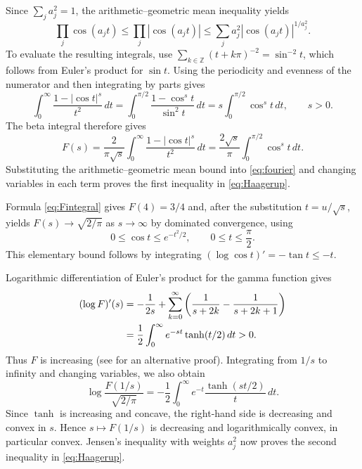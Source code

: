 \documentclass[a4paper,twoside,11pt,reqno]{amsart}
\theoremstyle{definition}
\theoremstyle{remark}
\newcommand{\1}{\mathbbm{1}}
\newcommand{\Z}{\mathbb{Z}}
\def \Z {\mathbb{Z}}
\begin{document}
Since $\sum_j a_j^2=1$, the arithmetic--geometric mean inequality yields
\[
 \prod_j\cos(a_jt)\le\prod_j|\cos(a_jt)|
 \le\sum_j a_j^2|\cos(a_jt)|^{1/a_j^2}.
\]
To evaluate the resulting integrals, use
$\sum_{k\in\Z}(t+k\pi)^{-2}=\sin^{-2}t$, which follows from Euler's product for $\sin t$. Using the periodicity and evenness of the numerator and then integrating by parts gives
\begin{equation}\label{eq:cosineintegral}
 \int_0^\infty\frac{1-|\cos t|^s}{t^2}\,dt
 =\int_0^{\pi/2}\frac{1-\cos^s t}{\sin^2t}\,dt
 =s\int_0^{\pi/2}\cos^s t\,dt,\qquad s>0.
\end{equation}
The beta integral therefore gives
\begin{equation}\label{eq:Fintegral}
 F(s)=\frac2{\pi\sqrt s}\int_0^\infty\frac{1-|\cos t|^s}{t^2}\,dt
     =\frac{2\sqrt s}{\pi}\int_0^{\pi/2}\cos^s t\,dt.
\end{equation}
Substituting the arithmetic--geometric mean bound into \eqref{eq:fourier} and changing variables in each term proves the first inequality in \eqref{eq:Haagerup}.

Formula \eqref{eq:Fintegral} gives $F(4)=3/4$ and, after the substitution $t=u/\sqrt s$, yields $F(s)\to\sqrt{2/\pi}$ as $s\to\infty$ by dominated convergence, using
\begin{equation}\label{eq:cosgaussian}
 0\le\cos t\le e^{-t^2/2},\qquad 0\le t\le\frac\pi2.
\end{equation}
This elementary bound follows by integrating $(\log\cos t)'=-\tan t\le-t$.

Logarithmic differentiation of Euler's product for the gamma function gives
\begin{align}
 (\log F)'(s)
 &=-\frac1{2s}+\sum_{k=0}^\infty
       \left(\frac1{s+2k}-\frac1{s+2k+1}\right)\notag\\
 &=\frac12\int_0^\infty e^{-st}\tanh(t/2)\,dt>0.
 \label{eq:logderivative}
\end{align}
Thus $F$ is increasing (see \cite[Section~4.2, proof of Theorem~32]{NT23} for an alternative proof). Integrating from $1/s$ to infinity and changing variables, we also obtain
\begin{equation}\label{eq:reciprocal}
 \log\frac{F(1/s)}{\sqrt{2/\pi}}
 =-\frac12\int_0^\infty e^{-t}\frac{\tanh(st/2)}t\,dt.
\end{equation}
Since $\tanh$ is increasing and concave, the right-hand side is decreasing and convex in $s$. Hence $s\mapsto F(1/s)$ is decreasing and logarithmically convex, in particular convex. Jensen's inequality with weights $a_j^2$ now proves the second inequality in \eqref{eq:Haagerup}.
\end{document}
